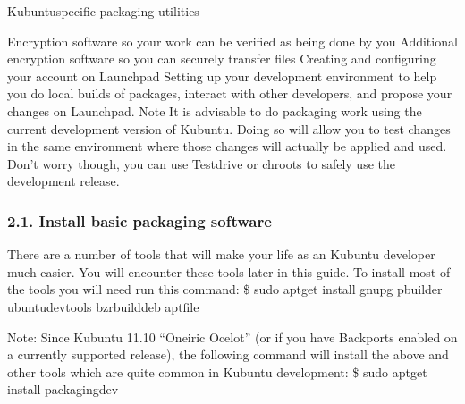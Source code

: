 \documentclass[letterpaper,10pt,english]{sphinxmanual}
\begin{document}
\sphinxAtStartPar
Kubuntu\sphinxhyphen{}specific packaging utilities

\sphinxAtStartPar
Encryption software so your work can be verified as being done by you
Additional encryption software so you can securely transfer files
Creating and configuring your account on Launchpad
Setting up your development environment to help you do local builds of packages, interact with other developers, and propose your changes on Launchpad.
Note
It is advisable to do packaging work using the current development version of Kubuntu. Doing so will allow you to test changes in the same environment where those changes will actually be applied and used.
Don’t worry though, you can use Testdrive or chroots to safely use the development release.


\subsubsection{2.1. Install basic packaging software}
\label{\detokenize{docs/packaging-guide/getting-started:install-basic-packaging-software}}
\sphinxAtStartPar
There are a number of tools that will make your life as an Kubuntu developer much easier. You will encounter these tools later in this guide. To install most of the tools you will need run this command:
\$ sudo apt\sphinxhyphen{}get install gnupg pbuilder ubuntu\sphinxhyphen{}dev\sphinxhyphen{}tools bzr\sphinxhyphen{}builddeb apt\sphinxhyphen{}file

\sphinxAtStartPar
Note: Since Kubuntu 11.10 “Oneiric Ocelot” (or if you have Backports enabled on a currently supported release), the following command will install the above and other tools which are quite common in Kubuntu development:
\$ sudo apt\sphinxhyphen{}get install packaging\sphinxhyphen{}dev
\end{document}
